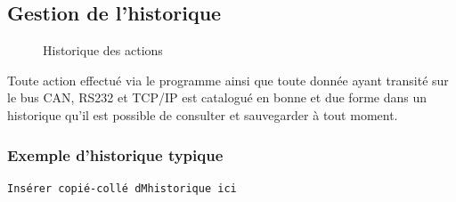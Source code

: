 \documentclass[10pt,a4paper,final]{article}
\begin{document}
\begin{spacing}{1.5}
\subsection{Gestion de l'historique}
\begin{figure}[hbtp]
\caption{Historique des actions}
\centering
{}
\end{figure}
Toute action effectué via le programme ainsi que toute donnée ayant transité sur le bus CAN, RS232 et TCP/IP est catalogué en bonne et due forme dans un historique qu'il est possible de consulter et sauvegarder à tout moment.

\subsubsection{Exemple d'historique typique}
\end{spacing}
\begin{verbatim}
Insérer copié-collé dMhistorique ici
\end{verbatim}
\end{document}

